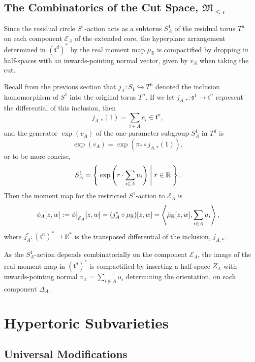 \documentclass{article}
\newcommand{\ra}{\rightarrow}
\newcommand{\lbracket}{\left(}
\newcommand{\rbracket}{\right)}
\newcommand{\e}{\epsilon}
\newcommand{\RR}{\mathbb{R}}
\newcommand{\mcE}{\mathcal{E}}
\newcommand{\mft}{\mathfrak{t}}
\newcommand{\mc}[1]{\mathcal{#1}}
\newcommand{\mf}[1]{\mathfrak{#1}}
\newcommand{\mrr}{\mu_{\mathbb{R}}}
\newcommand\restr[2]{{%
		\left.\kern-\nulldelimiterspace %
		#1 %
		\vphantom{\big|} %
		\right|_{#2} %
}}
\begin{document}
	\subsection{The Combinatorics of the Cut Space, $\mf{M}_{\leq \e}$}
	
	Since the residual circle $S^{1}$-action acts as a subtorus $S_{A}^{1}$ of the residual torus $T^{d}$ on each component $\mc{E}_{A}$ of the extended core, the hyperplane arrangement determined in $(\mft^{d})^{\ast}$ by the real moment map $\bar{\mu}_{\RR}$ is compactified by dropping in half-spaces with an inwards-pointing normal vector, given by $v_{A}$ when taking the cut. 
	
	Recall from the previous section that $j_{A}: S_{1} \hookrightarrow T^{n}$ denoted the inclusion homomorphism of $S^{1}$ into the original torus $T^{n}$. If we let $j_{A, \ast}: \mf{s}^{1} \rightarrow \mft^{n}$ represent the differential of this inclusion, then
	\[
	j_{A,\ast}(1) = \sum_{i \in A} e_{i} \in \mft^{n},
	\]
	and the generator $\exp(v_{A})$ of the one-parameter subgroup $S_{A}^{1}$ in $T^{d}$ is
	\[
	\exp(v_{A}) = \exp\lbracket \pi_{\ast} \circ j_{A, \ast}(1) \rbracket,
	\]
	or to be more concise,
	\[
	S_{A}^{1} = \Set{ \exp \lbracket r \cdot \sum_{i \in A} u_{i} \rbracket | r \in \RR }.
	\]
	Then the moment map for the restricted $S^{1}$-action to $\mcE_{A}$ is
	\begin{equation*}
		\phi_{A}[z,w] := \restr{\phi}{\mcE_{A}} [z,w] =  (j_{A}^{\ast} \circ \mrr)[z,w] = \left\langle \bar{\mu}_{\RR}[z,w], \sum_{i\in A} u_{i} \right\rangle,
	\end{equation*}
	where $j_{A}^{\ast} : (\mft^{n})^{\ast} \ra \RR^{\ast}$ is the transposed differential of the inclusion, $j_{A, \ast}$.
	
	As the $S_{A}^{1}$-action depends combinatorially on the component $\mcE_{A}$, the image of the real moment map in $(\mft^{d})^{\ast}$ is compactified by inserting a half-space $Z_{A}$ with inwards-pointing normal $v_{A} = \sum_{i \not\in A}u_{i}$ determining the orientation, on each component $\Delta_{A}$.
	
	\section{Hypertoric Subvarieties}
	
	\subsection{Universal Modifications}
	
\end{document}
